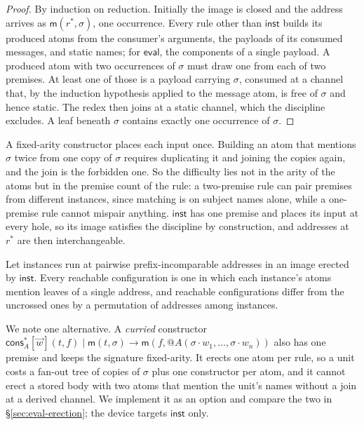 \documentclass[acmsmall,screen,review,anonymous]{acmart}
\makeatletter
\newcommand{\quo}[1]{@#1}
\newcommand{\red}{\longrightarrow}
\newcommand{\mm}{\mathsf{m}}
\newcommand{\cons}{\mathsf{cons}}
\newcommand{\inst}{\mathsf{inst}}
\makeatother
\begin{document}
\begin{proof}
By induction on reduction. Initially the image is closed and the address
arrives as $\mm(r^{*},\sigma)$, one occurrence. Every rule other than $\inst$
builds its produced atoms from the consumer's arguments, the payloads of its
consumed messages, and static names; for $\mathsf{eval}$, the components of a
single payload. A produced atom with two occurrences of $\sigma$ must draw one
from each of two premises. At least one of those is a payload carrying
$\sigma$, consumed at a channel that, by the induction hypothesis applied to
the message atom, is free of $\sigma$ and hence static. The redex then joins at
a static channel, which the discipline excludes. A leaf beneath $\sigma$
contains exactly one occurrence of $\sigma$.
\end{proof}

A fixed-arity constructor places each input once. Building an atom that
mentions $\sigma$ twice from one copy of $\sigma$ requires duplicating it and
joining the copies again, and the join is the forbidden one. So the
difficulty lies not in the arity of the atoms but in the premise count of the
rule: a two-premise rule can pair premises from different instances, since
matching is on subject names alone, while a one-premise rule cannot mispair
anything. $\inst$ has one premise and places its input at every hole, so its
image satisfies the discipline by construction, and addresses at $r^{*}$ are
then interchangeable.

\begin{lemma}[Permutation]
\label{lem:perm}
Let instances run at pairwise prefix-incomparable addresses in an image
erected by $\inst$. Every reachable configuration is one in which each
instance's atoms mention leaves of a single address, and reachable
configurations differ from the uncrossed ones by a permutation of addresses
among instances.
\end{lemma}

We note one alternative. A \emph{curried} constructor
$\cons^{*}_{A}[\vec w](t,f) \mid \mm(t,\sigma) \red
\mm(f,\quo{A(\sigma\cdot w_{1},\dots,\sigma\cdot w_{n})})$ also has one
premise and keeps the signature fixed-arity. It erects one atom per rule, so a
unit costs a fan-out tree of copies of $\sigma$ plus one constructor per atom,
and it cannot erect a stored body with two atoms that mention the unit's names
without a join at a derived channel. We implement it as an option and compare
the two in \S\ref{sec:eval-erection}; the device targets $\inst$ only.
\end{document}
